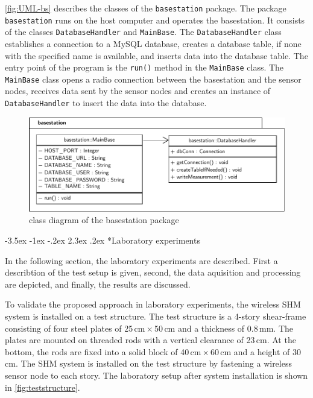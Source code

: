 \documentclass[12pt,a4paper]{scrartcl}
\makeatletter
\renewcommand\section{\@startsection{section}{1}{\z@}%
                     {-3.5ex \@plus -1ex \@minus -.2ex}%
                     {2.3ex \@plus.2ex}%
                     {\normalfont\large\bfseries}}
\makeatother
\begin{document}
\autoref{fig:UML-bs} describes the classes of the \texttt{base\-station} package.
The package \texttt{base\-station} runs on the host computer and operates the basestation.
It consists of the classes \texttt{Database\-Handler} and \texttt{Main\-Base}.
The \texttt{Database\-Handler} class establishes a connection to a MySQL database, creates a database table, if none with the specified name is available, and inserts data into the database table.
The entry point of the program is the \texttt{run()} method in the \texttt{Main\-Base} class. The \texttt{Main\-Base} class opens a radio connection between the basestation and the sensor nodes, receives data sent by the sensor nodes and creates an instance of \texttt{Database\-Handler} to insert the data into the database.

\begin{figure}[h!]
    \centering
    \includegraphics[width = \textwidth]{figures/uml-basestation.pdf}
    \caption{class diagram of the basestation package}
    \label{fig:UML-bs}
\end{figure}



\section*{Laboratory experiments}

In the following section, the laboratory experiments are described.
First a describtion of the test setup is given, second, the data aquisition and processing are depicted, and finally, the results are discussed. 

To validate the proposed approach in laboratory experiments, the wireless SHM system is installed on a test structure.
The test structure is a 4-story shear-frame consisting of four steel plates of 25\,cm\,$\times$\,50\,cm and a thickness of 0.8\,mm.
The plates are mounted on threaded rods with a vertical clearance of 23\,cm.
At the bottom, the rods are fixed into a solid block of 40\,cm\,$\times$\,60\,cm and a height of 30\,cm.
The SHM system is installed on the test structure by fastening a wireless sensor node to each story.
The laboratory setup after system installation is shown in \autoref{fig:teststructure}.
\end{document}
